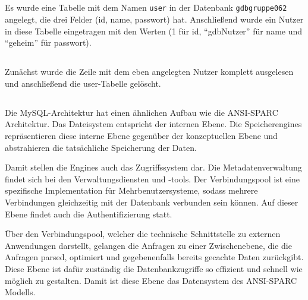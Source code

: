 \documentclass[ngerman]{gdb-aufgabenblatt}
\begin{document}
	\subsection{} %
		Es wurde eine Tabelle mit dem Namen \texttt{user} in der Datenbank \texttt{gdb\textunderscore gruppe062} angelegt, die drei Felder (id, name, passwort) hat. Anschließend wurde ein Nutzer in diese Tabelle eingetragen mit den Werten (1 für id, "`gdbNutzer"' für name und "`geheim"' für passwort).
	\subsection{} %
		Zunächst wurde die Zeile mit dem eben angelegten Nutzer komplett ausgelesen und anschließend die user-Tabelle gelöscht.
	\subsection{} %
		Die MySQL-Architektur hat einen ähnlichen Aufbau wie die ANSI-SPARC Architektur. Das Dateisystem entspricht der internen Ebene. Die Speicherengines repräsentieren diese interne Ebene gegenüber der konzeptuellen Ebene und abstrahieren die tatsächliche Speicherung der Daten. 
		
		Damit stellen die Engines auch das Zugriffssystem dar. Die Metadatenverwaltung findet sich bei den Verwaltungsdiensten und -tools. Der Verbindungspool ist eine spezifische Implementation für Mehrbenutzersysteme, sodass mehrere Verbindungen gleichzeitig mit der Datenbank verbunden sein können. Auf dieser Ebene findet auch die Authentifizierung statt.
		
		Über den Verbindungspool, welcher die technische Schnittstelle zu externen Anwendungen darstellt, gelangen die Anfragen zu einer Zwischenebene, die die Anfragen parsed, optimiert und gegebenenfalls bereits gecachte Daten zurückgibt. Diese Ebene ist dafür zuständig die Datenbankzugriffe so effizient und schnell wie möglich zu gestalten. Damit ist diese Ebene das Datensystem des ANSI-SPARC Modells.
\end{document}

